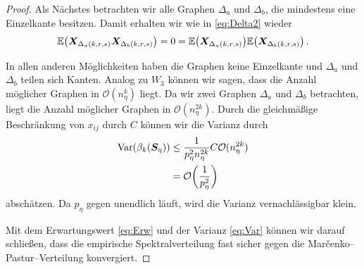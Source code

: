 \documentclass[../Bachelor_LennartKoliwer.tex]{subfiles}
\begin{document}
\begin{proof}
    Als Nächstes betrachten wir alle Graphen $\Delta_a$ und $ \Delta_b$, die mindestens eine Einzelkante besitzen. 
    Damit erhalten wir wie in \eqref{eq:Delta2} wieder 
    \begin{align*}
        \EE\lr{\bm{X}_{\Delta_a(k,r,s)}\bm{X}_{\Delta_b(k,r,s)}} = 0 = \EE\lr{\bm{X}_{\Delta_a(k,r,s)}}\EE\lr{\bm{X}_{\Delta_b(k,r,s)}}\,.
    \end{align*}

    In allen anderen Möglichkeiten haben die Graphen keine Einzelkante und $\Delta_a$ und $\Delta_b$ teilen sich Kanten.
    Analog zu $W_3$ können wir sagen, dass die Anzahl möglicher Graphen in $\mathcal{O}(n_\eta^k)$ liegt. 
    Da wir zwei Graphen $\Delta_a$ und $\Delta_b$ betrachten, liegt die Anzahl möglicher Graphen in $\mathcal{O}(n_\eta^{2k})$.
    Durch die gleichmäßige Beschränkung von $x_{ij}$ durch $C$ können wir die Varianz durch
    \begin{align}
        \text{Var}(\beta_k(\bm{S}_\eta)) &\leq \frac{1}{p_\eta^2n_\eta^{2k}}C\mathcal{O}(n_\eta^{2k}) \nonumber\\
        &= \mathcal{O}\lr{\frac{1}{p_\eta^2}} \label{eq:Var}
    \end{align}
    abschätzen.
    Da $p_\eta$ gegen unendlich läuft, wird die Varianz vernachlässigbar klein.

    Mit dem Erwartungswert \eqref{eq:Erw} und der Varianz \eqref{eq:Var} können wir darauf schließen, dass die empirische Spektralverteilung fast sicher gegen die Mar\v{c}enko--Pastur--Verteilung konvergiert.
\end{proof}
\end{document}
